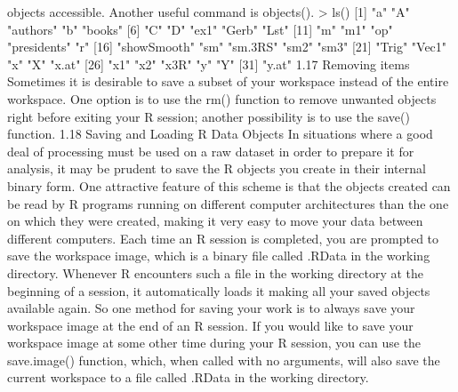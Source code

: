 objects accessible. Another useful command is objects().
> ls()
[1] "a" "A" "authors" "b" "books"
[6] "C" "D" "ex1" "Gerb" "Lst"
[11] "m" "m1" "op" "presidents" "r"
[16] "showSmooth" "sm" "sm.3RS" "sm2" "sm3"
[21] "Trig" "Vec1" "x" "X" "x.at"
[26] "x1" "x2" "x3R" "y" "Y"
[31] "y.at"
1.17 Removing items
Sometimes it is desirable to save a subset of your workspace instead of the entire workspace.
One option is to use the rm() function to remove unwanted objects right before exiting your R
session; another possibility is to use the save() function.
1.18 Saving and Loading R Data Objects
In situations where a good deal of processing must be used on a raw dataset in order to prepare
it for analysis, it may be prudent to save the R objects you create in their internal binary form.
One attractive feature of this scheme is that the objects created can be read by R programs
running on different computer architectures than the one on which they were created, making it
very easy to move your data between different computers. Each time an R session is completed,
you are prompted to save the workspace image, which is a binary file called .RData in the
working directory.
Whenever R encounters such a file in the working directory at the beginning of a session,
it automatically loads it making all your saved objects available again. So one method for
saving your work is to always save your workspace image at the end of an R session. If you
would like to save your workspace image at some other time during your R session, you can use
the save.image() function, which, when called with no arguments, will also save the current
workspace to a file called .RData in the working directory.

